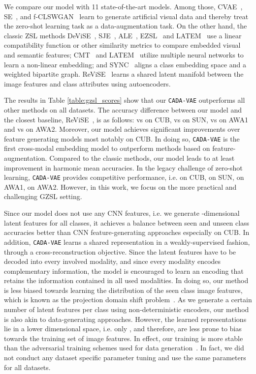 \documentclass[10pt,twocolumn,letterpaper]{article}
\newcommand{\myparagraph}[1]{\vspace{6pt}\noindent{\bf #1}}
\begin{document}
\myparagraph{Generalized Zero-Shot Learning.}
We compare our model with 11 state-of-the-art models. Among those, CVAE~\cite{cvae}, SE~\cite{segzsl}, and f-CLSWGAN~\cite{featgen} learn to generate artificial visual data and thereby treat the zero-shot learning task as a data-augmentation task.
On the other hand, the classic ZSL methods DeViSE~\cite{devise}, SJE~\cite{sje}, ALE~\cite{ss}, EZSL~\cite{ezsl} and LATEM~\cite{latem} use a linear compatibility function or other similarity metrics to compare embedded visual and semantic features; CMT~\cite{socher2013zero} and LATEM~\cite{latem} utilize multiple neural networks to learn a non-linear embedding; and SYNC~\cite{sync} aligns a class embedding space and a weighted bipartite graph. ReViSE~\cite{tsai2017learning} learns a shared latent manifold between the image features and class attributes using autoencoders. 

The results in Table \ref{table:gzsl_scores} show that our \texttt{CADA-VAE} outperforms all other methods on all datasets. The accuracy difference between our model and the closest baseline, ReViSE~\cite{tsai2017learning}, is as follows:  vs  on CUB,  vs  on SUN,  vs  on AWA1 and  vs  on AWA2. Moreover, our model achieves significant improvements over feature generating models most notably on CUB. In doing so, \texttt{CADA-VAE} is the first cross-modal embedding model to outperform methods based on feature-augmentation. Compared to the classic methods, our model leads to at least  improvement in harmonic mean accuracies. In the legacy challenge of zero-shot learning, \texttt{CADA-VAE} provides competitive performance, i.e.  on CUB,  on SUN,  on AWA1,  on AWA2. However, in this work, we focus on the more practical and challenging GZSL setting.

Since our model does not use any CNN features, i.e. we generate -dimensional latent features for all classes, it achieves a balance between seen and unseen class accuracies better than CNN feature-generating approaches especially on CUB.
In addition, \texttt{CADA-VAE} learns
a shared representation in a weakly-supervised fashion, through a cross-reconstruction objective. Since the latent features have to be decoded into every involved modality, and since every modality encodes complementary information, the model is encouraged to learn an encoding that retains the information contained in all used modalities. In doing so, our method is less biased towards learning the distribution of the seen class image features, which is known as the projection domain shift problem~\cite{fu2014transductive}. As we generate a certain number of latent features per class using non-deterministic encoders, our method is also akin to data-generating approaches. However, the learned representations lie in a lower dimensional space, i.e. only , and therefore, are less prone to bias towards the training set of image features. 
In effect, our training is more stable than the adversarial training schemes used for data generation~\cite{featgen}. In fact, we did not conduct any dataset specific parameter tuning and use the same parameters for all datasets.
\end{document}
